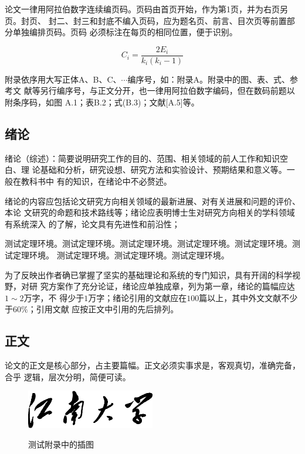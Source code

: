 \documentclass[phd]{jnuthesis}
\begin{document}
论文一律用阿拉伯数字连续编页码。页码由首页开始，作为第1页，并为右页另页。封页、
封二、封三和封底不编入页码，应为题名页、前言、目次页等前置部分单独编排页码。页码
必须标注在每页的相同位置，便于识别。

\begin{equation}
    C_i = \frac{2E_i}{k_i(k_i-1)}
\end{equation}

附录依序用大写正体A、B、C、$\cdots$编序号，如：附录A。附录中的图、表、式、参考文
献等另行编序号，与正文分开，也一律用阿拉伯数字编码，但在数码前题以附条序码，如图
A.1；表B.2；式(B.3)；文献[A.5]等。

\subsection{绪论}

绪论（综述）：简要说明研究工作的目的、范围、相关领域的前人工作和知识空白、理
论基础和分析，研究设想、研究方法和实验设计、预期结果和意义等。一般在教科书中
有的知识，在绪论中不必赘述。

绪论的内容应包括论文研究方向相关领域的最新进展、对有关进展和问题的评价、本论
文研究的命题和技术路线等；绪论应表明博士生对研究方向相关的学科领域有系统深入
的了解，论文具有先进性和前沿性；

\begin{problem}
测试定理环境。测试定理环境。测试定理环境。测试定理环境。测试定理环境。测试定理环境。
测试定理环境。测试定理环境。测试定理环境。
\end{problem}

为了反映出作者确已掌握了坚实的基础理论和系统的专门知识，具有开阔的科学视野，对研
究方案作了充分论证，绪论应单独成章，列为第一章，绪论的篇幅应达$1\sim 2$万字，不
得少于$1$万字；绪论引用的文献应在$100$篇以上，其中外文文献不少于$60\%$；引用文献
应按正文中引用的先后排列。

\subsection{正文}

论文的正文是核心部分，占主要篇幅。正文必须实事求是，客观真切，准确完备，合乎
逻辑，层次分明，简便可读。

\begin{figure}[htbp]
  \centering
  \includegraphics[width= 0.5\textwidth]{jnuname.eps}\\
  \caption{测试附录中的插图}\label{fig:appendix2}
\end{figure}
\end{document}
